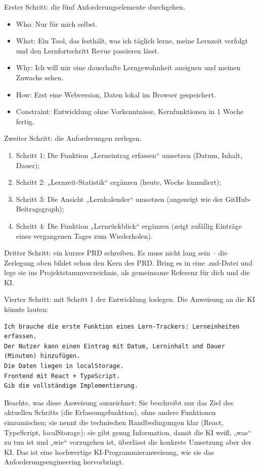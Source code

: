 Erster Schritt: die fünf Anforderungselemente durchgehen.

\begin{itemize}
  \item Who: Nur für mich selbst.
  \item What: Ein Tool, das festhält, was ich täglich lerne, meine Lernzeit verfolgt und den Lernfortschritt Revue passieren lässt.
  \item Why: Ich will mir eine dauerhafte Lerngewohnheit aneignen und meinen Zuwachs sehen.
  \item How: Erst eine Webversion, Daten lokal im Browser gespeichert.
  \item Constraint: Entwicklung ohne Vorkenntnisse, Kernfunktionen in 1 Woche fertig.
\end{itemize}

Zweiter Schritt: die Anforderungen zerlegen.

\begin{enumerate}
  \item Schritt 1: Die Funktion „Lerneintrag erfassen“ umsetzen (Datum, Inhalt, Dauer);
  \item Schritt 2: „Lernzeit-Statistik“ ergänzen (heute, Woche kumuliert);
  \item Schritt 3: Die Ansicht „Lernkalender“ umsetzen (angezeigt wie der GitHub-Beitragsgraph);
  \item Schritt 4: Die Funktion „Lernrückblick“ ergänzen (zeigt zufällig Einträge eines vergangenen Tages zum Wiederholen).
\end{enumerate}

Dritter Schritt: ein kurzes PRD schreiben. Es muss nicht lang sein – die Zerlegung oben bildet schon den Kern des PRD. Bring es in eine .md-Datei und lege sie ins Projektstammverzeichnis, als gemeinsame Referenz für dich und die KI.

Vierter Schritt: mit Schritt 1 der Entwicklung loslegen. Die Anweisung an die KI könnte lauten:

\begin{lstlisting}
Ich brauche die erste Funktion eines Lern-Trackers: Lerneinheiten erfassen.
Der Nutzer kann einen Eintrag mit Datum, Lerninhalt und Dauer (Minuten) hinzufügen.
Die Daten liegen in localStorage.
Frontend mit React + TypeScript.
Gib die vollständige Implementierung.
\end{lstlisting}

Beachte, was diese Anweisung auszeichnet: Sie beschreibt nur das Ziel des aktuellen Schritts (die Erfassungsfunktion), ohne andere Funktionen einzumischen; sie nennt die technischen Randbedingungen klar (React, TypeScript, localStorage); sie gibt genug Information, damit die KI weiß, „was“ zu tun ist und „wie“ vorzugehen ist, überlässt die konkrete Umsetzung aber der KI. Das ist eine hochwertige KI-Programmieranweisung, wie sie das Anforderungsengineering hervorbringt.

